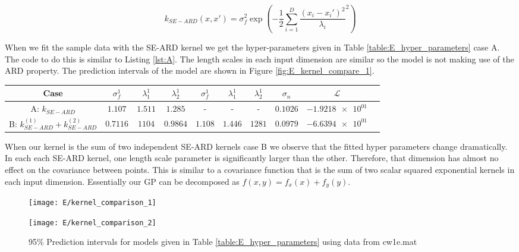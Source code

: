 \documentclass[11pt]{article}
\newcommand{\Lik}{\mathcal{L}}
\begin{document}
\begin{equation}
    k_{SE-ARD}(x, x') = \sigma_f^2 \exp(-\frac{1}{2}\sum_{i=1}^{D} \frac{(x_i - x_i')^2}{\lambda_i}^2)
    \label{eq:SEARD}
\end{equation}

When we fit the sample data with the SE-ARD kernel we get the hyper-parameters given in Table \ref{table:E_hyper_parameters} case A. The code to do this is similar to Listing \ref{lst:A}. The length scales in each input dimension are similar so the model is not making use of the ARD property. The prediction intervals of the model are shown in Figure \ref{fig:E_kernel_compare_1}. 

\begin{table*}[h]
    \centering
    \small
    \begin{tabular}{|c|c|c|c|c|c|c|c|c|c|}
        \hline
        Case & $\sigma_f^1$ & $\lambda_1^1$ & $\lambda_2^1$ & $\sigma_f^1$ & $\lambda_1^1$ & $\lambda_2^1$ & $\sigma_n$ & $\Lik$ \\
        \hline
        A: $k_{SE-ARD}$ & $1.107$ & $1.511$ & $1.285$ & - & - & - & $0.1026$ & $\num{-1.9218e+01}$ \\ 
        B: $k_{SE-ARD}^{(1)} + k_{SE-ARD}^{(2)}$ & $0.7116$ & $1104$ & $0.9864$ & $1.108$ & $1.446$ & $1281$ & $0.0979$ & $\num{-6.6394e+01}$ \\
        \hline
    \end{tabular}
    \caption{Hyper-parameter values for periodic SE covariance function}
    \label{table:E_hyper_parameters}
\end{table*}

When our kernel is the sum of two independent SE-ARD kernels case B we observe that the fitted hyper parameters change dramatically. In each each SE-ARD kernel, one length scale parameter is significantly larger than the other. Therefore, that dimension has almost no effect on the covariance between points. This is similar to a covariance function that is the sum of two scalar squared exponential kernels in each input dimension. Essentially our GP can be decomposed as $f(x,y) = f_x(x) + f_y(y)$. 

\begin{figure}[h]
    \centering
    \begin{minipage}{0.45\textwidth}
        \centering
        \texttt{[image: E/kernel\_comparison\_1]} 
        \label{fig:E_kernel_compare_1}
    \end{minipage}
    \begin{minipage}{0.45\textwidth}
        \centering
        \texttt{[image: E/kernel\_comparison\_2]} 
        \label{fig:E_kernel_compare_2}
    \end{minipage}
    \caption{95\% Prediction intervals for models given in Table \ref{table:E_hyper_parameters} using data from cw1e.mat}
    \label{fig:E_kernel_compare}
\end{figure}
\end{document}
